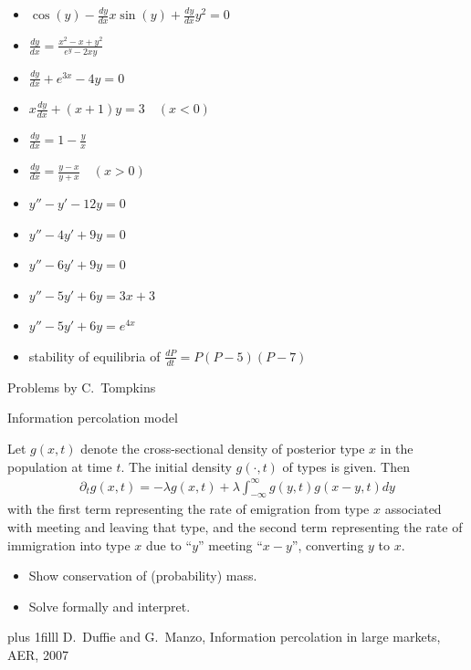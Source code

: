 \documentclass[onepage, 12pt]{beamer}
\def\Bottom#1{\vskip 0pt plus 1filll #1}
\begin{document}
%

\begin{frame}[t]{}{}
    \begin{itemize}
    \item 
        $\cos(y) - \frac{dy}{dx}x \sin(y) + \frac{dy}{dx}y^2 = 0$
    \item
        $\frac{dy}{dx} = \frac{x^2-x+y^2}{e^y-2xy}$
    \item
        $\frac{dy}{dx} + e^{3x} - 4y = 0$
    \item
        $x \frac{dy}{dx} + (x+1)y = 3 \quad (x<0)$
    \item
        $\frac{dy}{dx} = 1 - \frac{y}{x}$
    \item
        $\frac{dy}{dx} = \frac{y-x}{y+x} \quad (x>0)$
    \item
        $y''-y' -12y = 0$
    \item
        $y'' - 4y' + 9y = 0$
    \item
        $y''-6y'+9y = 0$
    \item
        $y''-5y' +6y = 3x + 3$
    \item 
        $y''-5y' +6y = e^{4x}$
    \item
        stability of equilibria of $\frac{dP}{dt} = P(P-5)(P-7)$
    \end{itemize}
    
    \hfill
    {\footnotesize Problems by C.~Tompkins}
\end{frame}

%

\begin{frame}[t]{Information percolation model}{}

    Let $g(x, t)$ denote the cross-sectional 
    density of posterior type $x$
    in the population at time $t$.
    The initial density $g(\cdot, t)$
    of types is given.
    Then
    \begin{align}
        \partial_t g(x, t)
        =
        -\lambda g(x, t)
        +
        \lambda \int_{-\infty}^{\infty}
        g(y, t) g(x - y, t) dy
    \end{align}
    with 
    the first term representing 
    the rate of emigration 
    from type $x$
    associated with meeting and leaving that type,
    and 
    the second term representing
    the rate of immigration
    into type $x$
    due to ``$y$'' meeting ``$x - y$'',
    converting $y$ to $x$.

    \begin{itemize}
    \item 
        Show conservation of (probability) mass.
    \item
        Solve formally and interpret.
    \end{itemize}

    \Bottom{%
        \footnotesize
        D.~Duffie and G.~Manzo, Information percolation in large markets, AER, 2007
    }
\end{frame}
\end{document}
